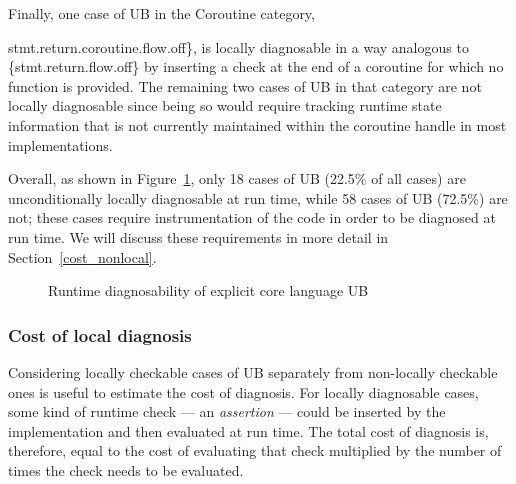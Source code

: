 Finally, one case of UB in the Coroutine category, {stmt.return.coroutine.flow.off\}, is locally diagnosable in a way analogous to \{stmt.return.flow.off\} by inserting a check at the end of a coroutine for which no  function is provided. The remaining two cases of UB in that category are not locally diagnosable since being so would require tracking runtime state information that is not currently maintained within the coroutine handle in most implementations. 

Overall, as shown in Figure~\ref{piechart_locally}, only 18 cases of UB (22.5\% of all cases) are unconditionally locally diagnosable at run time, while 58 cases of UB (72.5\%) are not; these cases require instrumentation of the code in order to be diagnosed at run time. We will discuss these requirements in more detail in Section~\ref{cost_nonlocal}.

\vspace{5mm} %
\begin{figure}[t!]
    \centering
    \caption{Runtime diagnosability of explicit core language UB}
    \label{piechart_locally}
\end{figure}

\subsubsection{Cost of local diagnosis}
\label{cost_local}

Considering locally checkable cases of UB separately from non-locally checkable ones is useful to estimate the cost of diagnosis. For locally diagnosable cases, some kind of runtime check --- an \emph{assertion} --- could be inserted by the implementation and then evaluated at run time. The total cost of diagnosis is, therefore, equal to the cost of evaluating that check multiplied by the number of times the check needs to be evaluated.

}
